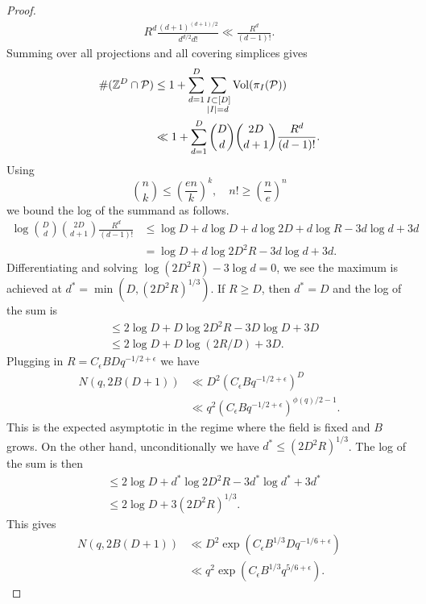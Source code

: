 \documentclass[10pt,a4paper]{amsart}
\newcommand{\bZ}{\mathbb{Z}}
\def\cP{{\mathcal P}}
\begin{document}
\begin{proof}
\begin{align*}
R^d \frac{(d+1)^{(d+1)/2}}{d^{d/2} d!}
\ll
\frac{R^d}{(d-1)!}.
\end{align*}
Summing over all projections and all covering simplices gives
\begin{align*}
    \#(\bZ^D \cap \cP)
    &\leq
    1 + \sum_{d=1}^D
    \sum_{\substack{I \subset [D] \\ \abs{I} = d}}
    \operatorname{Vol}(\pi_I(\cP))
    \\
    &\ll
    1 + \sum_{d=1}^D
    \binom{D}{d} \binom{2D}{d+1}
    \frac{R^d}{(d-1)!}.
\end{align*}
Using \[
\binom{n}{k} \leq \left(\frac{en}{k} \right)^k,
\quad
n! \geq \left( \frac{n}{e} \right)^n
\]
we bound the log of the summand as follows.
\begin{align*}
\log \binom{D}{d} \binom{2D}{d+1}
    \frac{R^d}{(d-1)!} & \leq \log D + d \log D + d \log 2 D + d \log R - 3 d \log d + 3d
\\
&= \log D + d \log 2D^2R - 3 d \log d  + 3d.
\end{align*}
Differentiating and solving $\log(2D^2R) - 3 \log d = 0$, we see the maximum is achieved at $d^* = \min(D, (2D^2 R)^{1/3})$. If $R \geq D$, then $d^* = D$ and the log of the sum is
\begin{align*}
    &\leq 2\log D + D \log 2D^2 R - 3 D \log D + 3 D
    \\
    &\leq 2\log D + D \log (2R/D) + 3 D.
\end{align*}
Plugging in $R = C_\epsilon B D q^{-1/2+\epsilon}$ we have
\begin{align*}
N(q,2B(D+1)) &\ll  D^2 \left(C_\epsilon B q^{-1/2+\epsilon}\right)^D
\\
&\ll q^2 \left(C_\epsilon B q^{-1/2+\epsilon}\right)^{\phi(q)/2-1}.
\end{align*}
This is the expected asymptotic in the regime where the field is fixed and $B$ grows. On the other hand, unconditionally we have $d^* \leq (2D^2 R)^{1/3}$. The log of the sum is then
\begin{align*}
    &\leq 2\log D + d^* \log 2D^2R - 3 d^* \log d^*  + 3d^*
    \\
    &\leq 2\log D + 3(2D^2 R)^{1/3}.
\end{align*}
This gives
\begin{align*}
N(q,2B(D+1)) &\ll D^2 \exp \left( C_\epsilon B^{1/3} D q^{-1/6+\epsilon} \right)
\\
&\ll q^2 \exp \left( C_\epsilon B^{1/3} q^{5/6+\epsilon} \right).
\end{align*}

\end{proof}
\end{document}
